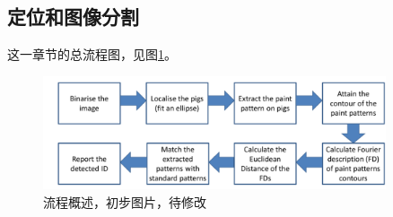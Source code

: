 \subsection{定位和图像分割}
这一章节的总流程图，见图\ref{fig-steps}。
\begin{figure}[htbp]
    \centering
    \includegraphics[width=0.9\textwidth]{pic/steps.png}
    \caption{流程概述，初步图片，待修改}
    \label{fig-steps}
\end{figure}

